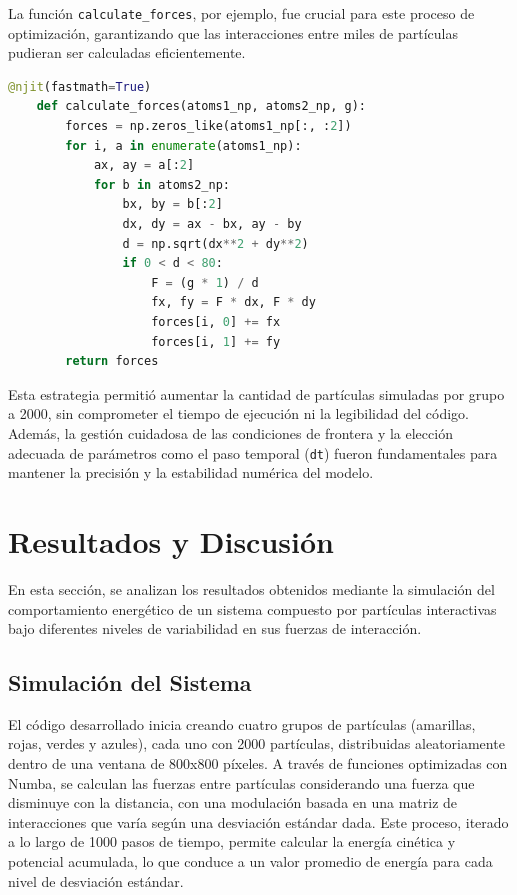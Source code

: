 \begin{itemize}
La función \texttt{calculate_forces}, por ejemplo, fue crucial para este proceso de optimización, garantizando que las interacciones entre miles de partículas pudieran ser calculadas eficientemente.

\begin{lstlisting}[language=Python]
    @njit(fastmath=True)
    def calculate_forces(atoms1_np, atoms2_np, g):
        forces = np.zeros_like(atoms1_np[:, :2])
        for i, a in enumerate(atoms1_np):
            ax, ay = a[:2]
            for b in atoms2_np:
                bx, by = b[:2]
                dx, dy = ax - bx, ay - by
                d = np.sqrt(dx**2 + dy**2)
                if 0 < d < 80:
                    F = (g * 1) / d
                    fx, fy = F * dx, F * dy
                    forces[i, 0] += fx
                    forces[i, 1] += fy
        return forces
\end{lstlisting}

Esta estrategia permitió aumentar la cantidad de partículas simuladas por grupo a 2000, sin comprometer el tiempo de ejecución ni la legibilidad del código. Además, la gestión cuidadosa de las condiciones de frontera y la elección adecuada de parámetros como el paso temporal (\texttt{dt}) fueron fundamentales para mantener la precisión y la estabilidad numérica del modelo.

\section{Resultados y Discusión}

En esta sección, se analizan los resultados obtenidos mediante la simulación del comportamiento energético de un sistema compuesto por partículas interactivas bajo diferentes niveles de variabilidad en sus fuerzas de interacción.

\subsection{Simulación del Sistema}

El código desarrollado inicia creando cuatro grupos de partículas (amarillas, rojas, verdes y azules), cada uno con 2000 partículas, distribuidas aleatoriamente dentro de una ventana de 800x800 píxeles. A través de funciones optimizadas con Numba, se calculan las fuerzas entre partículas considerando una fuerza que disminuye con la distancia, con una modulación basada en una matriz de interacciones que varía según una desviación estándar dada. Este proceso, iterado a lo largo de 1000 pasos de tiempo, permite calcular la energía cinética y potencial acumulada, lo que conduce a un valor promedio de energía para cada nivel de desviación estándar.


\end{itemize}

